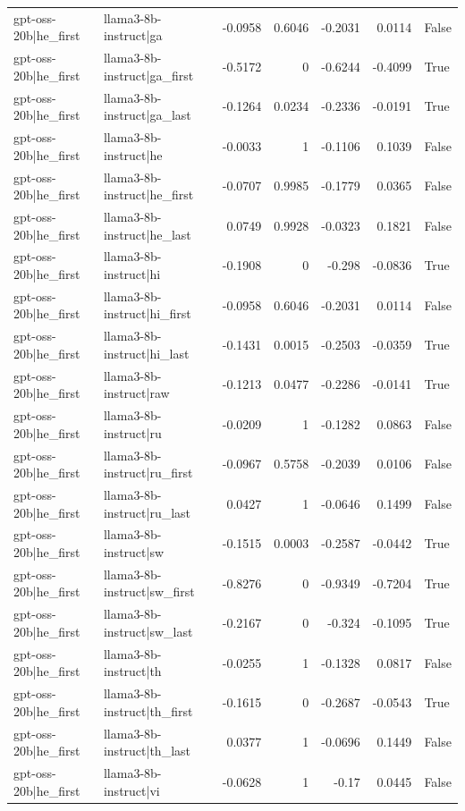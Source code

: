 \begin{table}
\begin{tabular}{l l r r r r l}
gpt-oss-20b|he_first & llama3-8b-instruct|ga & -0.0958 & 0.6046 & -0.2031 & 0.0114 & False \\
gpt-oss-20b|he_first & llama3-8b-instruct|ga_first & -0.5172 & 0 & -0.6244 & -0.4099 & True \\
gpt-oss-20b|he_first & llama3-8b-instruct|ga_last & -0.1264 & 0.0234 & -0.2336 & -0.0191 & True \\
gpt-oss-20b|he_first & llama3-8b-instruct|he & -0.0033 & 1 & -0.1106 & 0.1039 & False \\
gpt-oss-20b|he_first & llama3-8b-instruct|he_first & -0.0707 & 0.9985 & -0.1779 & 0.0365 & False \\
gpt-oss-20b|he_first & llama3-8b-instruct|he_last & 0.0749 & 0.9928 & -0.0323 & 0.1821 & False \\
gpt-oss-20b|he_first & llama3-8b-instruct|hi & -0.1908 & 0 & -0.298 & -0.0836 & True \\
gpt-oss-20b|he_first & llama3-8b-instruct|hi_first & -0.0958 & 0.6046 & -0.2031 & 0.0114 & False \\
gpt-oss-20b|he_first & llama3-8b-instruct|hi_last & -0.1431 & 0.0015 & -0.2503 & -0.0359 & True \\
gpt-oss-20b|he_first & llama3-8b-instruct|raw & -0.1213 & 0.0477 & -0.2286 & -0.0141 & True \\
gpt-oss-20b|he_first & llama3-8b-instruct|ru & -0.0209 & 1 & -0.1282 & 0.0863 & False \\
gpt-oss-20b|he_first & llama3-8b-instruct|ru_first & -0.0967 & 0.5758 & -0.2039 & 0.0106 & False \\
gpt-oss-20b|he_first & llama3-8b-instruct|ru_last & 0.0427 & 1 & -0.0646 & 0.1499 & False \\
gpt-oss-20b|he_first & llama3-8b-instruct|sw & -0.1515 & 0.0003 & -0.2587 & -0.0442 & True \\
gpt-oss-20b|he_first & llama3-8b-instruct|sw_first & -0.8276 & 0 & -0.9349 & -0.7204 & True \\
gpt-oss-20b|he_first & llama3-8b-instruct|sw_last & -0.2167 & 0 & -0.324 & -0.1095 & True \\
gpt-oss-20b|he_first & llama3-8b-instruct|th & -0.0255 & 1 & -0.1328 & 0.0817 & False \\
gpt-oss-20b|he_first & llama3-8b-instruct|th_first & -0.1615 & 0 & -0.2687 & -0.0543 & True \\
gpt-oss-20b|he_first & llama3-8b-instruct|th_last & 0.0377 & 1 & -0.0696 & 0.1449 & False \\
gpt-oss-20b|he_first & llama3-8b-instruct|vi & -0.0628 & 1 & -0.17 & 0.0445 & False \\

\end{tabular}
\end{table}
